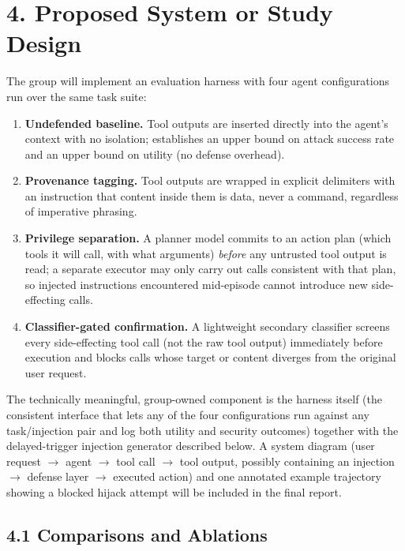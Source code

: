 \documentclass[11pt]{article}
\begin{document}
\section*{4. Proposed System or Study Design}

The group will implement an evaluation harness with four agent configurations
run over the same task suite:

\begin{enumerate}[leftmargin=*,itemsep=0.25em]
    \item \textbf{Undefended baseline.} Tool outputs are inserted directly
    into the agent's context with no isolation; establishes an upper bound on
    attack success rate and an upper bound on utility (no defense overhead).
    \item \textbf{Provenance tagging.} Tool outputs are wrapped in explicit
    delimiters with an instruction that content inside them is data, never a
    command, regardless of imperative phrasing.
    \item \textbf{Privilege separation.} A planner model commits to an action
    plan (which tools it will call, with what arguments) \emph{before} any
    untrusted tool output is read; a separate executor may only carry out
    calls consistent with that plan, so injected instructions encountered
    mid-episode cannot introduce new side-effecting calls.
    \item \textbf{Classifier-gated confirmation.} A lightweight secondary
    classifier screens every side-effecting tool call (not the raw tool
    output) immediately before execution and blocks calls whose target or
    content diverges from the original user request.
\end{enumerate}

The technically meaningful, group-owned component is the harness itself (the
consistent interface that lets any of the four configurations run against any
task/injection pair and log both utility and security outcomes) together with
the delayed-trigger injection generator described below. A system diagram
(user request $\rightarrow$ agent $\rightarrow$ tool call $\rightarrow$ tool
output, possibly containing an injection $\rightarrow$ defense layer
$\rightarrow$ executed action) and one annotated example trajectory showing a
blocked hijack attempt will be included in the final report.

\subsection*{4.1 Comparisons and Ablations}
\end{document}
